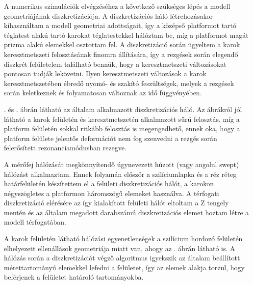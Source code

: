 A numerikus szimulációk elvégzéséhez a következő szükséges lépés a modell geometriájának diszkretizációja. A diszkretizációs háló létrehozásakor kihasználtam a modell geometriai adottságait, így a középső platformot tartó téglatest alakú tartó karokat téglatestekkel hálóztam be, míg a platformot magát prizma alakú elemekkel osztottam fel. A diszkretizáció során ügyeltem a karok keresztmetszeti felosztásának finomra állítására, így a rezgések során elegendő diszkrét felületelem található bennük, hogy a keresztmetszeti változásokat pontosan tudják lekövetni. Ilyen keresztmetszeti változások a karok keresztmetszetében ébredő nyomó- és szakító feszültségek, melyek a rezgések során keletkeznek és folyamatosan változnak az idő függvényében.


. és . ábrán látható az általam alkalmazott diszkretizációs háló. Az ábrákról jól látható a karok felületén és keresztmetszetén alkalmazott sűrű felosztás, míg a platform felületén sokkal ritkább felosztás is megengedhető, ennek oka, hogy a platform felülete jelentős deformációt nem fog szenvedni a rezgés során felerősített rezonanciamódusban rezegve.

A mérőfej hálózását megkönnyítendő úgynevezett húzott (vagy angolul swept) hálózást alkalmaztam. Ennek folyamán először a szilíciumlapka és a réz réteg határfelületén készítettem el a felületi diszkretizációs hálót, a karokon négyszögletes a platformon háromszögű elemeket használva. A térfogati diszkretizáció elérésére az így kialakított felületi hálót eltoltam a Z tengely mentén és az általam megadott darabszámú diszkretizációs elemet hoztam létre a modell térfogatában.


A karok felületén látható hálózási egyenetlenségek a szilícium hordozó felületén elhelyezett ellenállások geometriája miatt van, ahogy az . ábrán látható is. A hálózás során a diszkretizációt végző algoritmus igyekszik az általam beállított mérettartományú elemekkel lefedni a felületet, így az elemek alakja torzul, hogy beférjenek a felületet határoló tartományokba.


